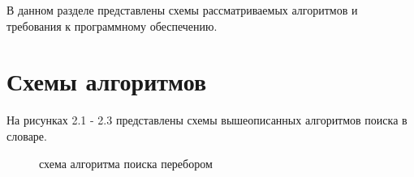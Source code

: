 \documentclass[12pt,a4paper]{report}
\begin{document}
В данном разделе представлены схемы рассматриваемых алгоритмов и требования к программному 
обеспечению.

\section{Схемы алгоритмов}

На рисунках 2.1 - 2.3 представлены схемы вышеописанных алгоритмов поиска в словаре.

\begin{figure}[h]
    \caption{схема алгоритма поиска перебором}
    \label{fig:image}
\end{figure}
\end{document}
